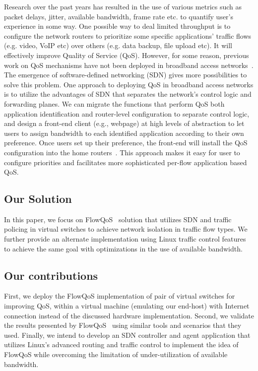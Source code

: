 Research over the past years has resulted in the use of various metrics such as packet delays, jitter, available bandwidth, frame rate etc. to quantify user’s experience in some way. One possible way to deal limited throughput is to configure the network routers to prioritize some specific applications' traffic flows (e.g. video, VoIP etc) over others (e.g. data backup, file upload etc). It will effectively improve Quality of Service (QoS). However, for some reason, previous work on QoS mechanisms have not been deployed in broadband access networks~\cite{Seddiki2014}. The emergence of software-defined networking (SDN) gives more possibilities to solve this problem. One approach to deploying QoS in broadband access networks is to utilize the advantages of SDN that separates the network's control logic and forwarding planes. We can migrate the functions that perform QoS both application identification and router-level configuration to separate control logic, and design a front-end client (e.g., webpage) at high levels of abstraction to let users to assign bandwidth to each identified application according to their own preference. Once users set up their preference, the front-end will install the QoS configuration into the home routers~\cite{Seddiki2014}. This approach makes it easy for user to configure priorities and facilitates more sophisticated per-flow application based QoS. 

\subsection{Our Solution}
In this paper, we focus on FlowQoS~\cite{Seddiki2014} solution that utilizes SDN and traffic policing in virtual switches to achieve network isolation in traffic flow types. We further provide an alternate implementation using Linux traffic control features to achieve the same goal with optimizations in the use of available bandwidth.

\subsection{Our contributions}
First, we deploy the FlowQoS implementation of pair of virtual switches for improving QoS, within a virtual machine (emulating our end-host) with Internet connection instead of the discussed hardware implementation. Second, we validate the results presented by FlowQoS~\cite{Seddiki2014} using similar tools and scenarios that they used. Finally, we intend to develop an SDN controller and agent application that utilizes Linux’s advanced routing and traffic control to implement the idea of FlowQoS while overcoming the limitation of under-utilization of available bandwidth. 

